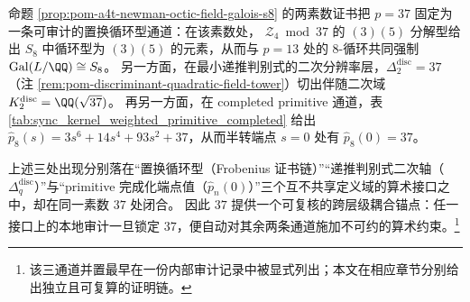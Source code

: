 \begin{remark}\label{rem:pom-a4t-prime37-three-channel-anchor}
命题 \ref{prop:pom-a4t-newman-octic-field-galois-s8} 的两素数证书把 \(p=37\) 固定为一条可审计的置换循环型通道：在该素数处，
\(\mathcal Z_4\bmod 37\) 的 \((3)(5)\) 分解型给出 \(S_8\) 中循环型为 \((3)(5)\) 的元素，从而与 \(p=13\) 处的 \(8\)-循环共同强制 \(\mathrm{Gal}(L/\QQ)\cong S_8\)。
另一方面，在最小递推判别式的二次分辨率层，\(\Delta_2^{\mathrm{disc}}=37\)（注 \ref{rem:pom-discriminant-quadratic-field-tower}）切出伴随二次域 \(K_2^{\mathrm{disc}}=\QQ(\sqrt{37})\)。
再另一方面，在 completed primitive 通道，表 \ref{tab:sync_kernel_weighted_primitive_completed} 给出
\(\widehat p_8(s)=3s^6+14s^4+93s^2+37\)，从而半转端点 \(s=0\) 处有 \(\widehat p_8(0)=37\)。
\par
上述三处出现分别落在“置换循环型（Frobenius 证书链）”“递推判别式二次轴（\(\Delta_q^{\mathrm{disc}}\)）”与“primitive 完成化端点值（\(\widehat p_n(0)\)）”三个互不共享定义域的算术接口之中，却在同一素数 \(37\) 处闭合。
因此 \(37\) 提供一个可复核的跨层级耦合锚点：任一接口上的本地审计一旦锁定 \(37\)，便自动对其余两条通道施加不可约的算术约束。\footnote{该三通道并置最早在一份内部审计记录中被显式列出；本文在相应章节分别给出独立且可复算的证明链。}
\end{remark}
